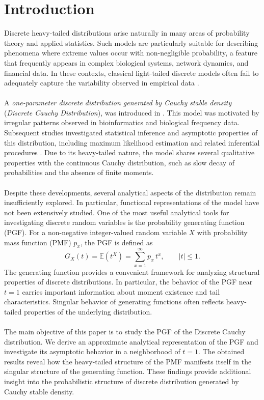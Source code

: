\documentclass[twoside]{article}
\begin{document}
\section{Introduction}
Discrete heavy-tailed distributions arise naturally in many areas of probability theory and applied statistics. Such models are particularly suitable for describing phenomena where extreme values occur with non-negligible probability, a feature that frequently appears in complex biological systems, network dynamics, and financial data. In these contexts, classical light-tailed discrete models often fail to adequately capture the variability observed in empirical data \cite{Foss:2013, Kotz:2005, Kuznetsov:2017, Kuznetsov:2022}.\\
\\
A   \textit{one-parameter discrete distribution generated by Cauchy stable density} (\textit{Discrete Cauchy Distribution}), was introduced in \cite{Farbod:2008}. This model was motivated by irregular patterns observed in bioinformatics and biological frequency data. Subsequent studies investigated statistical inference and asymptotic properties of this distribution, including maximum likelihood estimation and related inferential procedures \cite{Farbod:2008, Farbod:2010}. Due to its heavy-tailed nature, the model shares several qualitative properties with the continuous Cauchy distribution, such as slow decay of probabilities and the absence of finite moments.\\
\\
Despite these developments, several analytical aspects of the distribution remain insufficiently explored. In particular, functional representations of the model have not been extensively studied. One of the most useful analytical tools for investigating discrete random variables is the  probability generating function  (PGF). For a non-negative integer-valued random variable $X$ with probability mass function (PMF) $p_x$​, the PGF is defined as
\[  
G_X(t)=\mathbb{E}(t^X)=\sum_{x=1}^{\infty} p_x\, t^x,   \qquad |t|\le1.
\] 
The generating function provides a convenient framework for analyzing structural properties of discrete distributions. In particular, the behavior of the PGF near $t=1$ carries important information about moment existence and tail characteristics. Singular behavior of generating functions often reflects heavy-tailed properties of the underlying distribution.\\
\\
The main objective of this paper is to study the PGF  of  the Discrete Cauchy distribution. We derive an approximate analytical representation of the PGF and investigate its asymptotic behavior in a neighborhood of $t=1$.  The obtained results reveal how the heavy-tailed structure of the PMF manifests itself in the singular structure of the generating function. These findings provide additional insight into the probabilistic structure of discrete distribution generated by Cauchy stable density. 
\end{document}
